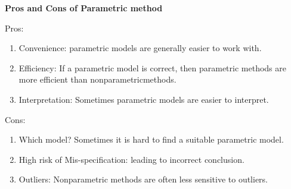 \documentclass[19pt,landscaoe]{article}
\begin{document}
\newpage
{\LARGE\centerline{\textbf{Pros and Cons of Parametric method}}}
\vskip25pt
\begin{minipage}{.9\textwidth}
    \Large Pros:
\begin{enumerate}
    \item Convenience: parametric models are generally easier to work with.

    \item Efficiency: If a parametric model is correct, then parametric methods are more efficient than nonparametricmethods.

    \item Interpretation: Sometimes parametric models are easier to interpret.

\end{enumerate}
Cons:
\begin{enumerate}

    \item Which model? Sometimes it is hard  to find a suitable parametric model.

    \item    High risk of Mis-specification: leading to incorrect conclusion.

    \item Outliers: Nonparametric methods are often less sensitive to outliers.

  \end{enumerate}
\end{minipage}



\end{document}
